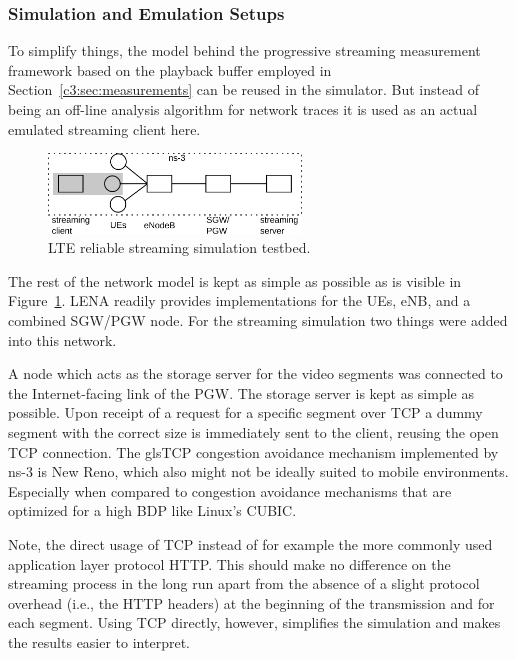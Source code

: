 \subsubsection{Simulation and Emulation Setups}

To simplify things, the model behind the progressive streaming measurement framework based on the playback buffer employed in Section~\ref{c3:sec:measurements} can be reused in the simulator. But instead of being an off-line analysis algorithm for network traces it is used as an actual emulated streaming client here.

\begin{figure}[htb]
	\centering
	\includegraphics[width=0.6\textwidth]{images/streaming-simulation.pdf}
	\caption{\acrshort{LTE} reliable streaming simulation testbed.}
\label{c6:fig:streaming-simulation}
\end{figure}

The rest of the network model is kept as simple as possible as is visible in Figure~\ref{c6:fig:streaming-simulation}. LENA readily provides implementations for the \glspl{UE}, \gls{eNB}, and a combined \gls{SGW}/\gls{PGW} node. For the streaming simulation two things were added into this network. 

A node which acts as the storage server for the video segments was connected to the Internet-facing link of the \gls{PGW}. The storage server is kept as simple as possible. Upon receipt of a request for a specific segment over \gls{TCP} a dummy segment with the correct size is immediately sent to the client, reusing the open \gls{TCP} connection. %
The gls{TCP} congestion avoidance mechanism implemented by ns-3 is New Reno, which also might not be ideally suited to mobile environments. Especially when compared to congestion avoidance mechanisms that are optimized for a high \gls{BDP} like Linux's CUBIC.

Note, the direct usage of \gls{TCP} instead of for example the more commonly used application layer protocol \gls{HTTP}. This should make no difference on the streaming process in the long run apart from the absence of a slight protocol overhead (i.e., the \gls{HTTP} headers) at the beginning of the transmission and for each segment. Using \gls{TCP} directly, however, simplifies the simulation and makes the results easier to interpret.

